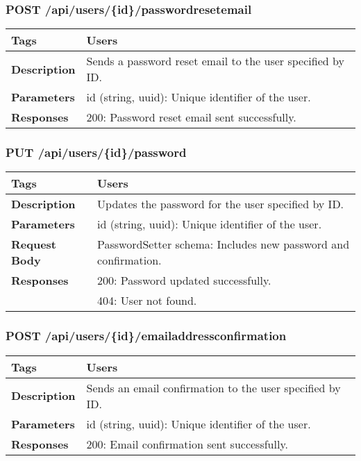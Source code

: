 \subsubsection*{POST /api/users/\{id\}/passwordresetemail}
\begin{longtable}{|>{\raggedright\arraybackslash}p{3cm}|p{10cm}|}
\hline
\textbf{Tags} & Users \\
\hline
\textbf{Description} & Sends a password reset email to the user specified by ID. \\
\hline
\textbf{Parameters} & id (string, uuid): Unique identifier of the user. \\
\hline
\textbf{Responses} & 200: Password reset email sent successfully. \\
\hline
\end{longtable}

\subsubsection*{PUT /api/users/\{id\}/password}
\begin{longtable}{|>{\raggedright\arraybackslash}p{3cm}|p{10cm}|}
\hline
\textbf{Tags} & Users \\
\hline
\textbf{Description} & Updates the password for the user specified by ID. \\
\hline
\textbf{Parameters} & id (string, uuid): Unique identifier of the user. \\
\hline
\textbf{Request Body} & PasswordSetter schema: Includes new password and confirmation. \\
\hline
\textbf{Responses} & 200: Password updated successfully. \\
 & 404: User not found. \\
\hline
\end{longtable}

\subsubsection*{POST /api/users/\{id\}/emailaddressconfirmation}
\begin{longtable}{|>{\raggedright\arraybackslash}p{3cm}|p{10cm}|}
\hline
\textbf{Tags} & Users \\
\hline
\textbf{Description} & Sends an email confirmation to the user specified by ID. \\
\hline
\textbf{Parameters} & id (string, uuid): Unique identifier of the user. \\
\hline
\textbf{Responses} & 200: Email confirmation sent successfully. \\
\hline
\end{longtable}
